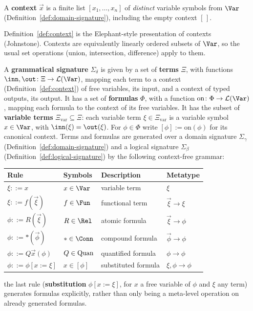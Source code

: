 \begin{definition}[Context]
\label{def:context}
\leanok
A \textbf{context} $\vec x$ is a finite list $[x_1,\ldots,x_n]$ of
\emph{distinct} variable symbols from $\Var$
(Definition~\ref{def:domain-signature}), including the empty context
$[\,]$.
\end{definition}

Definition~\ref{def:context} is the Elephant-style presentation of
contexts (Johnstone). Contexts are equivalently linearly ordered
subsets of $\Var$, so the usual set operations (union, intersection,
difference) apply to them.

\begin{definition}
\label{def:grammatical-signature}
\leanok
A \textbf{grammatical signature} $\Sigma_\delta$ is given by a set of
\textbf{terms} $\Xi$, with functions
$\inn, \out \colon \Xi \to \mathcal L(\Var)$, mapping each term to a
context (Definition~\ref{def:context}) of free variables, its input,
and a context of typed outputs, its output. It has a set of
\textbf{formulas} $\Phi$, with a function
$\mathrm{on} \colon \Phi \to \mathcal L(\Var)$, mapping each formula to
the context of its free variables. It has the subset of
\textbf{variable terms} $\Xi_{\mathrm{var}} \subseteq \Xi$: each
variable term $\xi \in \Xi_{\mathrm{var}}$ is a variable symbol
$x \in \Var$, with $\inn(\xi) = \out(\xi)$. For $\phi \in \Phi$ write
$[\phi] := \mathrm{on}(\phi)$ for its canonical context. Terms and
formulas are generated over a domain signature $\Sigma_\gamma$
(Definition~\ref{def:domain-signature}) and a logical signature
$\Sigma_\beta$ (Definition~\ref{def:logical-signature}) by the
following context-free grammar:
\begin{center}
\begin{tabular}{llll}
\hline
\textbf{Rule} & \textbf{Symbols} & \textbf{Description} & \textbf{Metatype} \\
\hline
$\xi ::= x$ & $x \in \Var$ & variable term & $\xi$ \\
$\xi ::= f(\vec\xi)$ & $f \in \Fun$ & functional term & $\vec\xi \to \xi$ \\
$\phi ::= R(\vec\xi)$ & $R \in \Rel$ & atomic formula & $\vec\xi \to \phi$ \\
$\phi ::= *(\vec\phi)$ & $* \in \Conn$ & compound formula & $\vec\phi \to \phi$ \\
$\phi ::= Q\vec x(\phi)$ & $Q \in \mathrm{Quan}$ & quantified formula & $\phi \to \phi$ \\
$\phi ::= \phi[x := \xi]$ & $x \in [\phi]$ & substituted formula & $\xi,\phi \to \phi$ \\
\hline
\end{tabular}
\end{center}
the last rule (\textbf{substitution} $\phi[x := \xi]$, for $x$ a
free variable of $\phi$ and $\xi$ any term) generates formulas
explicitly, rather than only being a meta-level operation on already
generated formulas.
\end{definition}

